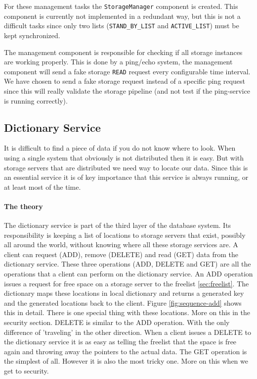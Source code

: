 \documentclass[12pt,a4paper]{scrartcl}
\begin{document}
For these management tasks the \verb|StorageManager| component is created. This component is currently not implemented in a redundant way, but this is not a difficult tasks since only two lists (\verb|STAND_BY_LIST| and \verb|ACTIVE_LIST|) must be kept synchronized.

The management component is responsible for checking if all storage instances are working properly. This is done by a ping/echo system, the management component will send a fake storage \verb|READ| request every configurable time interval. We have chosen to send a fake storage request instead of a specific ping request since this will really validate the storage pipeline (and not test if the ping-service is running correctly).

\subsection{Dictionary Service}
It is difficult to find a piece of data if you do not know where to look. When using a single system that obviously is not distributed then it is easy. But with storage servers that are distributed we need way to locate our data. Since this is an essential service it is of key importance that this service is always running, or at least most of the time. 

\paragraph{The theory}
The dictionary service is part of the third layer of the database system. Its responsibility is keeping a list of locations to storage servers that exist, possibly all around the world, without knowing where all these storage services are. A client can request (ADD), remove (DELETE) and read (GET) data from the dictionary service. These three operations (ADD, DELETE and GET) are all the operations that a client can perform on the dictionary service. An ADD operation issues a request for free space on a storage server to the freelist \ref{sec:freelist}. The dictionary maps these locations in local dictionary and returns a generated key and the generated locations back to the client. Figure \ref{fig:sequence-add} shows this in detail. There is one special thing with these locations. More on this in the security section. DELETE is similar to the ADD operation. With the only difference of 'traveling' in the other direction. When a client issues a DELETE to the dictionary service it is as easy as telling the freelist that the space is free again and throwing away the pointers to the actual data. The GET operation is the simplest of all. However it is also the most tricky one. More on this when we get to security.
\end{document}
